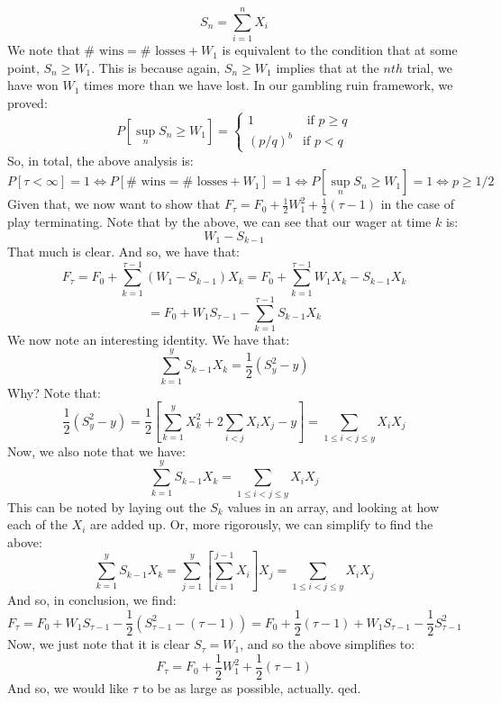 \documentclass[12pt,a4paper]{article}
\newcommand{\1}[1]{\mathbbm{1}\left\{ #1 \right\}}
\begin{document}
$$
	S_n = \sum_{i=1}^n X_i
$$
We note that $\text{$\#$ wins} = \text{$\#$ losses} + W_1$ is equivalent to the condition that at some point, $S_n \geq W_1$. This is because again, $S_n \geq W_1$ implies that at the $nth$ trial, we have won $W_1$ times more than we have lost. In our gambling ruin framework, we proved:
$$
	P\left[\sup_n S_n \geq W_1\right] = \begin{cases}
	1 & \text{ if $p \geq q$}\\
	(p/q)^b & \text{if $p < q$}
	\end{cases}
$$
So, in total, the above analysis is:
$$
	P\left[\tau < \infty\right] = 1 \Leftrightarrow
	P\left[\text{$\#$ wins} = \text{$\#$ losses} + W_1\right] = 1 \Leftrightarrow
	P\left[\sup_n S_n \geq W_1\right] = 1 \Leftrightarrow
	p \geq 1/2
$$
Given that, we now want to show that $F_\tau = F_0 + \frac{1}{2}W_1^2 + \frac{1}{2}(\tau - 1)$ in the case of play terminating. Note that by the above, we can see that our wager at time $k$ is:
$$
	W_1 - S_{k-1}
$$
That much is clear. And so, we have that:
$$
	F_\tau = F_0 + \sum_{k=1}^{\tau - 1} (W_1 - S_{k-1})X_k
	= F_0 + \sum_{k=1}^{\tau - 1} W_1X_k - S_{k-1}X_k
$$
$$
	= F_0 + W_1S_{\tau - 1} - \sum_{k=1}^{\tau - 1} S_{k-1}X_k
$$
We now note an interesting identity. We have that:
$$
	\sum_{k=1}^y S_{k-1}X_k = \frac{1}{2}(S_y^2 - y)
$$
Why? Note that:
$$
	\frac{1}{2}(S_y^2 - y) = \frac{1}{2}\left[\sum_{k=1}^y X_k^2 + 2 \sum_{i < j} X_iX_j - y\right] =
	\sum_{1 \leq i < j \leq y} X_iX_j
$$
Now, we also note that we have:
$$
	\sum_{k=1}^y S_{k-1}X_k = \sum_{1 \leq i < j \leq y} X_iX_j
$$
This can be noted by laying out the $S_k$ values in an array, and looking at how each of the $X_i$ are added up. Or, more rigorously, we can simplify to find the above:
$$
	\sum_{k=1}^y S_{k-1}X_k = \sum_{j=1}^y \left[\sum_{i=1}^{j-1} X_i\right]X_j = \sum_{1 \leq i < j \leq y} X_iX_j
$$
And so, in conclusion, we find:
$$
	F_\tau = F_0 + W_1S_{\tau - 1} - \frac{1}{2}(S_{\tau - 1}^2 - (\tau - 1)) =
	F_0 + \frac{1}{2}(\tau - 1) + W_1S_{\tau - 1} - \frac{1}{2}S_{\tau - 1}^2
$$
Now, we just note that it is clear $S_\tau = W_1$, and so the above simplifies to:
$$
	F_\tau = F_0 + \frac{1}{2}W_1^2 + \frac{1}{2}(\tau - 1)
$$
And so, we would like $\tau$ to be as large as possible, actually. qed.
\end{document}
